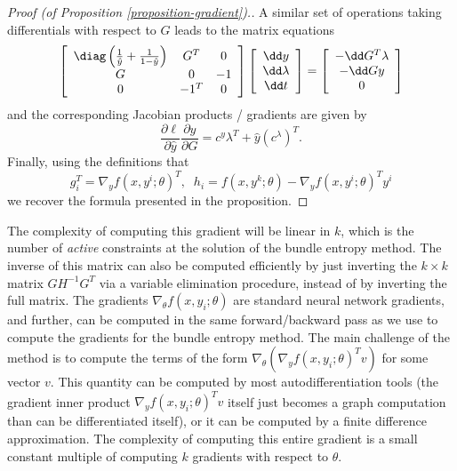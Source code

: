 \begin{proof}[Proof (of Proposition \ref{proposition-gradient}).]
A similar set of operations taking differentials with respect to $G$ leads to
the matrix equations
{\small
\begin{equation}
\left [ \begin{array}{ccc}
\diag\left(\frac{1}{\hat y} + \frac{1}{1-\hat y}\right) & G^T & 0 \\
G & 0 & -1 \\
0 & -1^T & 0 \end{array} \right ]
\left [ \begin{array}{c} \dd y \\ \dd \lambda \\ \dd t \end{array} \right ]
= \left [ \begin{array}{c} -\dd G^T \lambda \\ - \dd G y \\ 0 \end{array}
\right ]
\end{equation}
}
and the corresponding Jacobian products / gradients are given by
\begin{equation}
\frac{\partial \ell}{\partial \hat{y}} \frac{\partial \hat{y}}{\partial
G} = c^y \lambda^T + \hat{y} (c^\lambda)^T.
\end{equation}
Finally, using the definitions that
\begin{equation}
g_i^T = \nabla_y f (x, y^i;\theta)^T,\;\;  h_i = f(x, y^k;\theta) -
\nabla_y f(x,y^i;\theta)^T y^i
\end{equation}
we recover the formula presented in the proposition.
\end{proof}



The complexity of computing this gradient will be linear in $k$, which is the
number of \emph{active} constraints at the solution of the bundle entropy
method.  The inverse of this matrix can also be computed efficiently by just
inverting the $k
\times k$ matrix $G H^{-1} G^T$ via
a variable elimination procedure, instead of by inverting the full matrix.
The gradients $\nabla_\theta f(x,y_i;\theta)$ are standard neural network
gradients, and further, can be computed in the same forward/backward pass as we
use to compute the gradients for the bundle entropy method.
The main challenge of the method is to compute the terms of the form
$\nabla_\theta (\nabla_y f(x,y_i;\theta)^T v)$
for some vector $v$.  This quantity can be computed by most autodifferentiation
tools (the gradient inner product $\nabla_y f(x,y_i;\theta)^T v$ itself just
becomes a graph computation than can be differentiated itself), or it can be
computed by a finite difference approximation.
The complexity of computing this entire gradient is a small
constant multiple of computing $k$ gradients with respect to $\theta$.

